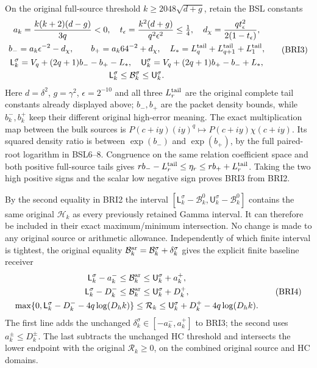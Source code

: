 On the original full-source threshold
$k\geq2048\sqrt{d+g}$, retain the BSL constants
\[
\begin{gathered}
 a_k=\frac{k(k+2)(d-g)}{3q}<0,\quad
 t_\epsilon=\frac{k^2(d+g)}{q^2\epsilon^2}\leq\tfrac14,
 \quad d_\chi=\frac{qt_\epsilon^2}{2(1-t_\epsilon)},\\
 b_-=a_k\epsilon^{-2}-d_\chi,
 \qquad b_+=a_k64^{-2}+d_\chi,
 \quad L_*=L_q^{\rm tail}+L_{q+1}^{\rm tail}+L_1^{\rm tail},\\
 \mathsf L_k^\sigma=V_q+(2q+1)b_- -b_+-L_*,\quad
 \mathsf U_k^\sigma=V_q+(2q+1)b_+ -b_-+L_*,\\
 \mathsf L_k^\sigma\leq\mathcal B_k^\sigma
                                  \leq\mathsf U_k^\sigma.
\end{gathered}\tag{BRI3}
\]
Here $d=\delta^2$, $g=\gamma^2$, $\epsilon=2^{-10}$ and
all three $L_r^{\rm tail}$ are the original complete tail constants
already displayed above; $b_-,b_+$ are the packet density bounds,
while $b_k^-,b_k^+$ keep their different original high-error meaning.
The exact multiplication map between the bulk sources is
$P(c+iy)(iy)^q\mapsto P(c+iy)\chi(c+iy)$.
Its squared density ratio is between $\exp(b_-)$ and
$\exp(b_+)$, by the full paired-root logarithm in BSL6--8.
Congruence on the same relation coefficient space and both positive
full-source tails gives $rb_- -L_r^{\rm tail}\leq\eta_r
\leq rb_++L_r^{\rm tail}$. Taking the two high positive signs
and the scalar low negative sign proves BRI3 from BRI2.

By the second equality in BRI2 the interval
$[\mathsf L_k^\sigma-\mathcal B_k^0,
\mathsf U_k^\sigma-\mathcal B_k^0]$ contains the same original
$\mathcal H_k$ as every previously retained Gamma interval.
It can therefore be included in their exact maximum/minimum
intersection. No change is made to any original source or
arithmetic allowance. Independently of which finite interval is
tightest, the original equality
$\mathcal B_k^{\rm ar}=\mathcal B_k^\sigma+\delta_k^\sigma$
gives the explicit finite baseline receiver
\[
\begin{gathered}
 \mathsf L_k^\sigma-a_k^-\leq\mathcal B_k^{\rm ar}
                                   \leq\mathsf U_k^\sigma+a_k^+,\\
 \mathsf L_k^\sigma-D_k^-\leq\mathcal B_k^{\rm ar}
                                   \leq\mathsf U_k^\sigma+D_k^+,\\
 \max\{0,\mathsf L_k^\sigma-D_k^- -4q\log(D_hk)\}
 \leq\mathcal R_k
 \leq\mathsf U_k^\sigma+D_k^+ -4q\log(D_hk).
\end{gathered}\tag{BRI4}
\]
The first line adds the unchanged
$\delta_k^\sigma\in[-a_k^-,a_k^+]$ to BRI3; the second
uses $a_k^\pm\leq D_k^\pm$. The last subtracts the unchanged
HC threshold and intersects the lower endpoint with the original
$\mathcal R_k\geq0$, on the combined original source and HC domains.


